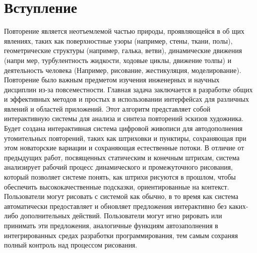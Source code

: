 \chapter{Вступление}
\label{cha:intro}
Повторение является неотъемлемой частью природы, проявляющейся в об щих явлениях, таких как поверхностные узоры (например, стены, ткани, полы), геометрические структуры (например, галька, ветви), динамические движения (напри мер, турбулентность жидкости, ходовые циклы, движение толпы) и деятельность человека (Например, рисование, жестикуляция, моделирование). Повторение было важным предметом изучения инженерных и научных дисциплин из-за повсеместности. Главная задача заключается в разработке общих и эффективных методов и простых в использовании интерфейсах для различных явлений и областей приложений. Этот алгоритм представляет собой интерактивную системы для анализа и синтеза повторений эскизов художника. Будет создана интерактивная система цифровой живописи для автодополнения утомительных повторений, таких как штриховки и пунктиры, сохраняющая при этом новаторские вариации и сохраняющая естественные потоки. В отличие от предыдущих работ, посвященных статическим и конечным штрихам, система анализирует рабочий процесс динамического и промежуточного рисования, который позволяет системе понять, как штрихи рисуются в прошлом, чтобы обеспечить высококачественные подсказки, ориентированные на контекст. Пользователи могут рисовать с системой как обычно, в то время как система автоматически предоставляет и обновляет предложения интерактивно без каких-либо дополнительных действий. Пользователи могут игно рировать или принимать эти предложения, аналогичные функциям автозаполнения в интегрированных средах разработки программирования, тем самым сохраняя полный контроль над процессом рисования.